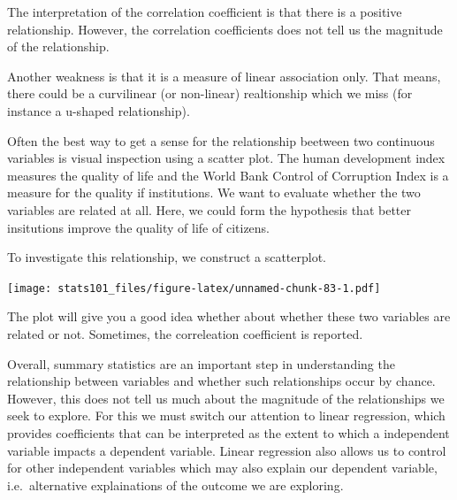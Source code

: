 \documentclass[]{article}
\newenvironment{Shaded}{\begin{snugshade}}{\end{snugshade}}
\newcommand{\DataTypeTok}[1]{\textcolor[rgb]{0.13,0.29,0.53}{#1}}
\newcommand{\DecValTok}[1]{\textcolor[rgb]{0.00,0.00,0.81}{#1}}
\newcommand{\KeywordTok}[1]{\textcolor[rgb]{0.13,0.29,0.53}{\textbf{#1}}}
\newcommand{\NormalTok}[1]{#1}
\newcommand{\OperatorTok}[1]{\textcolor[rgb]{0.81,0.36,0.00}{\textbf{#1}}}
\newcommand{\OtherTok}[1]{\textcolor[rgb]{0.56,0.35,0.01}{#1}}
\newcommand{\StringTok}[1]{\textcolor[rgb]{0.31,0.60,0.02}{#1}}
\begin{document}
The interpretation of the correlation coefficient is that there is a positive relationship. However, the correlation coefficients does not tell us the magnitude of the relationship.

Another weakness is that it is a measure of linear association only. That means, there could be a curvilinear (or non-linear) realtionship which we miss (for instance a u-shaped relationship).

Often the best way to get a sense for the relationship beetween two continuous variables is visual inspection using a scatter plot. The human development index measures the quality of life and the World Bank Control of Corruption Index is a measure for the quality if institutions. We want to evaluate whether the two variables are related at all. Here, we could form the hypothesis that better insitutions improve the quality of life of citizens.

To investigate this relationship, we construct a scatterplot.

\begin{Shaded}
\end{Shaded}

\texttt{[image: stats101\_files/figure-latex/unnamed-chunk-83-1.pdf]}

The plot will give you a good idea whether about whether these two variables are related or not. Sometimes, the correleation coefficient is reported.

Overall, summary statistics are an important step in understanding the relationship between variables and whether such relationships occur by chance. However, this does not tell us much about the magnitude of the relationships we seek to explore. For this we must switch our attention to linear regression, which provides coefficients that can be interpreted as the extent to which a independent variable impacts a dependent variable. Linear regression also allows us to control for other independent variables which may also explain our dependent variable, i.e.~alternative explainations of the outcome we are exploring.
\end{document}
